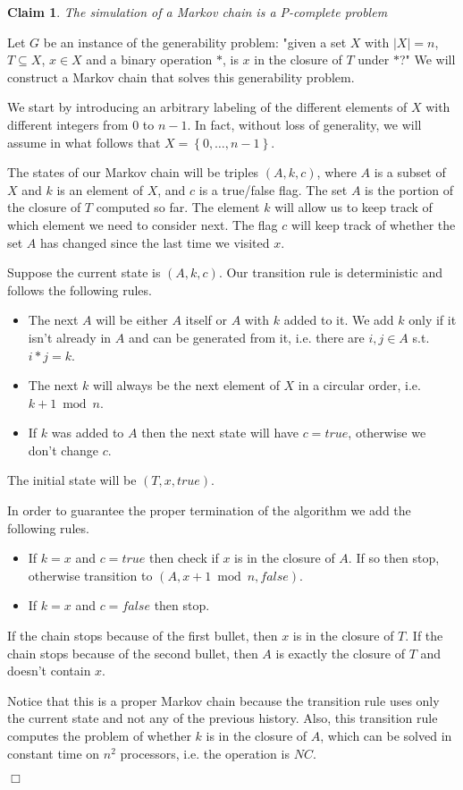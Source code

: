 \documentclass[11pt,letterpaper]{article}       %
\newtheorem{claim}{Claim}
\newenvironment{proof}           {\noindent{\bf Proof.} }%
                                 {\null\hfill$\Box$\par\medskip}
\begin{document}
\begin{claim}
The simulation of a Markov chain is a P-complete problem
\end{claim}
\begin{proof} 
Let $G$ be an instance of the generability problem:
	"given a set $X$ with $|X|=n$, 
	$T\subseteq X$, $x\in X$ and a binary operation $*$, 
	is $x$ in the closure of $T$ under $*$?"
We will construct a Markov chain that solves this generability problem.

We start by introducing an arbitrary labeling of the different elements of $X$
with different integers from $0$ to $n-1$.  In fact, without loss of
generality, we will assume in what follows that $X=\left\{0, \ldots,
n-1\right\}$. 

The states of our Markov chain will be triples $(A,k,c)$, where $A$ is a subset
of $X$ and $k$ is an element of $X$, and $c$ is a true/false flag.  The set $A$
is the portion of the closure of $T$ computed so far.  The element $k$ will
allow us to keep track of which element we need to consider next.  The flag $c$
will keep track of whether the set $A$ has changed since the last time we
visited $x$.

Suppose the current state is $(A, k, c)$.  Our transition rule is deterministic
and follows the following rules.
\begin{itemize}
\item The next $A$ will be either $A$ itself or $A$ with $k$ added to it.  We
add $k$ only if it isn't already in $A$ and can be generated from it, i.e.
there are $i,j\in A$ s.t. $i*j=k$.
\item The next $k$ will always be the next element of $X$ in a circular order,
i.e. $k+1\bmod n$.  
\item If $k$ was added to $A$ then the next state will have $c=true$, otherwise
we don't change $c$.  
\end{itemize}

The initial state will be $(T, x, true)$.

In order to guarantee the proper termination of the algorithm we add the
following rules.
\begin{itemize}
\item If $k=x$ and $c=true$ then check if $x$ is in the closure of $A$.  If so
then stop, otherwise transition to $(A, x+1\bmod n, false)$.
\item If $k=x$ and $c=false$ then stop.
\end{itemize}
If the chain stops because of the first bullet, then $x$ is in the closure of
$T$.  If the chain stops because of the second bullet, then $A$ is exactly the
closure of $T$ and doesn't contain $x$.

Notice that this is a proper Markov chain because the transition rule uses only
the current state and not any of the previous history.  Also, this transition
rule computes the problem of whether $k$ is in the closure of $A$, which can be
solved in constant time on $n^2$ processors, i.e.  the operation is $NC$.

\end{proof}
\end{document}
